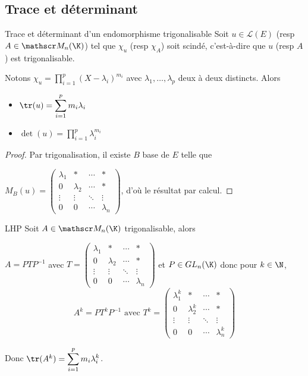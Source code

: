 \subsection{Trace et déterminant }

\begin{proposition}{Trace et déterminant d'un endomorphisme trigonalisable}{}
    Soit $u \in \mathscr L(E)$ (resp $A \in \mathscr M_n(\K)$) tel que $\chi_u$ (resp $\chi_A$) soit scindé, 
    c'est-à-dire que $u$ (resp $A$) est trigonalisable.

    Notons $\displaystyle \chi_u = \prod_{i = 1 }^{ p } (X - \lambda_i)^{m_i}$ avec $\lambda_1, \ldots, \lambda_p$ 
    deux à deux distincts. Alors 
    \begin{itemize}
        \item $\tr(u) = \displaystyle \sum_{i = 1 }^{ p } m_i \lambda_i$
        \item $\det(u) = \displaystyle \prod_{i = 1 }^{ p } \lambda_i^{m_i}$
    \end{itemize}
\end{proposition}

\begin{proof}
    Par trigonalisation, il existe $B$ base de $E$ telle que 

    $M_B(u) = \begin{pmatrix}
        \lambda_1 & * & \cdots & * \\
        0 & \lambda_2 & \cdots & * \\
        \vdots & \vdots & \ddots & \vdots \\
        0 & 0 & \cdots & \lambda_n
    \end{pmatrix}$, d'où le résultat par calcul. 
\end{proof}

\begin{corollaire}{LHP}{}
    Soit $A \in \mathscr M_n(\K)$ trigonalisable, alors 

    $A = PTP^{-1}$ avec $T = \begin{pmatrix}
        \lambda_1 & * & \cdots & * \\
        0 & \lambda_2 & \cdots & * \\
        \vdots & \vdots & \ddots & \vdots \\
        0 & 0 & \cdots & \lambda_n
    \end{pmatrix}$ et $P \in GL_n(\K)$
    donc pour $k \in \N$, 
    $$A^k = P T^k P^{-1} \text{ avec } T^k = \begin{pmatrix}
        \lambda_1^k & * & \cdots & * \\
        0 & \lambda_2^k & \cdots & * \\
        \vdots & \vdots & \ddots & \vdots \\
        0 & 0 & \cdots & \lambda_n^k
    \end{pmatrix}$$

    Donc $\tr(A^k) = \displaystyle \sum_{i = 1 }^{ p } m_i\lambda_i^k$.
\end{corollaire}

